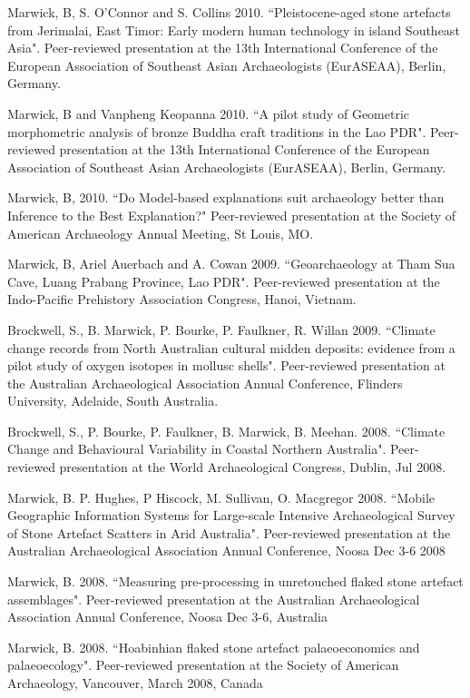 \ind Marwick, B, S. O’Connor and S. Collins 2010. ``Pleistocene-aged stone artefacts from Jerimalai, East Timor: Early modern human technology in island Southeast Asia". Peer-reviewed presentation at the 13th International Conference of the European Association of Southeast Asian Archaeologists (EurASEAA), Berlin, Germany.

\ind Marwick, B and Vanpheng Keopanna 2010. ``A pilot study of Geometric morphometric analysis of bronze Buddha craft traditions in the Lao PDR". Peer-reviewed presentation  at the 13th International Conference of the European Association of Southeast Asian Archaeologists (EurASEAA), Berlin, Germany.

\ind Marwick, B, 2010. ``Do Model-based explanations suit archaeology better than Inference to the Best Explanation?" Peer-reviewed presentation at the Society of American Archaeology Annual Meeting, St Louis, MO.

\ind Marwick, B, Ariel Auerbach and A. Cowan 2009. ``Geoarchaeology at Tham Sua Cave, Luang Prabang Province, Lao PDR". Peer-reviewed presentation at the Indo-Pacific Prehistory Association Congress, Hanoi, Vietnam.

\ind Brockwell, S., B. Marwick, P. Bourke, P. Faulkner, R. Willan 2009. ``Climate change records from North Australian cultural midden deposits: evidence from a pilot study of oxygen isotopes in mollusc shells". Peer-reviewed presentation  at the Australian Archaeological Association Annual Conference, Flinders University, Adelaide, South Australia.

\ind Brockwell, S., P. Bourke, P. Faulkner, B. Marwick, B. Meehan. 2008. ``Climate Change and Behavioural Variability in Coastal Northern Australia". Peer-reviewed presentation at the World Archaeological Congress, Dublin,  Jul 2008. 

\ind Marwick, B. P. Hughes, P Hiscock, M. Sullivan, O. Macgregor 2008. ``Mobile Geographic Information Systems for Large-scale Intensive Archaeological Survey of Stone Artefact Scatters in Arid Australia". Peer-reviewed presentation at the Australian Archaeological Association Annual Conference, Noosa Dec 3-6 2008

\ind Marwick, B. 2008. ``Measuring pre-processing in unretouched flaked stone artefact assemblages". Peer-reviewed presentation at the Australian Archaeological Association Annual Conference, Noosa Dec 3-6, Australia

\ind Marwick, B. 2008. ``Hoabinhian flaked stone artefact palaeoeconomics and palaeoecology". Peer-reviewed presentation at the Society of American Archaeology, Vancouver, March 2008, Canada

